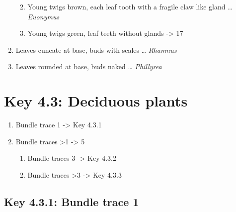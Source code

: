 \documentclass[openany]{book}
\providecommand{\tightlist}{%
  \setlength{\itemsep}{0pt}\setlength{\parskip}{0pt}}
\begin{document}
\begin{enumerate}
  \begin{enumerate}
  \def\labelenumii{\arabic{enumii}.}
  \setcounter{enumii}{14}
  \tightlist
  \item
    Young twigs brown, each leaf tooth with a fragile claw like gland \ldots{} \emph{Euonymus}
  \item
    Young twigs green, leaf teeth without glands -\textgreater{} 17
  \end{enumerate}
\item
  Leaves cuneate at base, buds with scales \ldots{} \emph{Rhamnus}
\item
  Leaves rounded at base, buds naked \ldots{} \emph{Phillyrea}
\end{enumerate}

\hypertarget{key-4.3-deciduous-plants}{%
\section*{Key 4.3: Deciduous plants}\label{key-4.3-deciduous-plants}}

\begin{enumerate}
\def\labelenumi{\arabic{enumi}.}
\tightlist
\item
  Bundle trace 1 -\textgreater{} Key 4.3.1
\item
  Bundle traces \textgreater{}1 -\textgreater{} 5

  \begin{enumerate}
  \def\labelenumii{\arabic{enumii}.}
  \setcounter{enumii}{2}
  \tightlist
  \item
    Bundle traces 3 -\textgreater{} Key 4.3.2
  \item
    Bundle traces \textgreater{}3 -\textgreater{} Key 4.3.3
  \end{enumerate}
\end{enumerate}

\hypertarget{key-4.3.1-bundle-trace-1}{%
\subsection*{Key 4.3.1: Bundle trace 1}\label{key-4.3.1-bundle-trace-1}}
\end{document}
